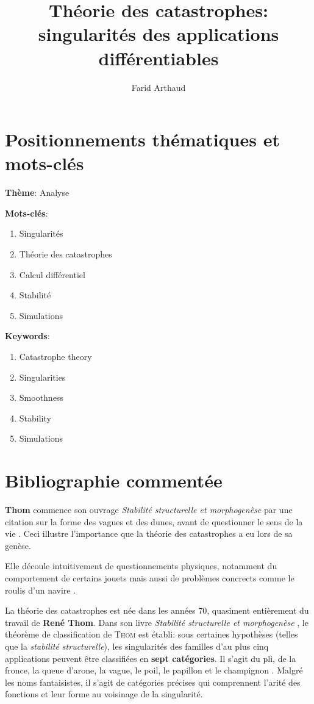 \documentclass{article}
\begin{document}
\title{Théorie des catastrophes: singularités des applications différentiables}
\author{Farid Arthaud}
\maketitle

\section{Positionnements thématiques et mots-clés}

\textbf{Thème}: Analyse

\textbf{Mots-clés}:
\begin{enumerate}
    \item Singularités
    \item Théorie des catastrophes
    \item Calcul différentiel
    \item Stabilité
    \item Simulations
\end{enumerate}

\textbf{Keywords}:

\begin{enumerate}
    \item Catastrophe theory
    \item Singularities
    \item Smoothness
    \item Stability
    \item Simulations
\end{enumerate}

\section{Bibliographie commentée}

\textbf{Thom} commence son ouvrage \textit{Stabilité structurelle et morphogenèse} par une citation sur la forme des vagues et des dunes, avant de questionner le sens de la vie \cite{thom}.
Ceci illustre l'importance que la théorie des catastrophes a eu lors de sa genèse.

Elle découle intuitivement de questionnements physiques, notamment du comportement de certains jouets \cite{bbcvid} mais aussi de problèmes concrects comme le roulis d'un navire \cite{poston}.

La théorie des catastrophes est née dans les années 70, quasiment entièrement du travail de \textbf{René Thom}.
Dans son livre \textit{Stabilité structurelle et morphogenèse} \cite{thom}, le théorème de classification de \textsc{Thom} est établi: sous certaines hypothèses (telles que la \textit{stabilité structurelle}), les singularités des familles d'au plus cinq applications peuvent être classifiées en \textbf{sept catégories}.
Il s'agit du pli, de la fronce, la queue d'arone, la vague, le poil, le papillon et le champignon \cite{wikipedia}.
Malgré les noms fantaisistes, il s'agit de catégories précises qui comprennent l'arité des fonctions et leur forme au voisinage de la singularité.
\end{document}
